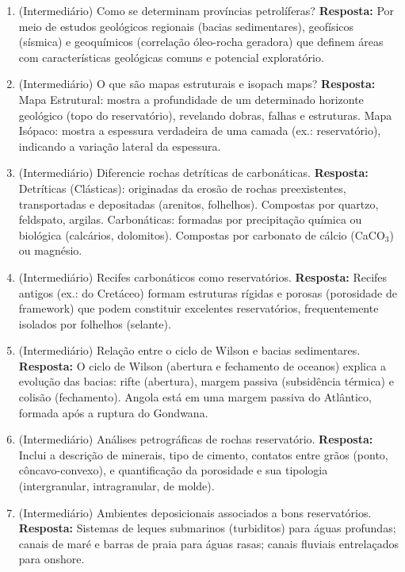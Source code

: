 \documentclass[11pt,a4paper]{article}
\begin{document}
\begin{enumerate}
  \item (Intermediário) Como se determinam províncias petrolíferas?
  \textbf{Resposta:} Por meio de estudos geológicos regionais (bacias sedimentares), geofísicos (sísmica) e geoquímicos (correlação óleo-rocha geradora) que definem áreas com características geológicas comuns e potencial exploratório.

  \item (Intermediário) O que são mapas estruturais e isopach maps?
  \textbf{Resposta:} Mapa Estrutural: mostra a profundidade de um determinado horizonte geológico (topo do reservatório), revelando dobras, falhas e estruturas. Mapa Isópaco: mostra a espessura verdadeira de uma camada (ex.: reservatório), indicando a variação lateral da espessura.

  \item (Intermediário) Diferencie rochas detríticas de carbonáticas.
  \textbf{Resposta:} Detríticas (Clásticas): originadas da erosão de rochas preexistentes, transportadas e depositadas (arenitos, folhelhos). Compostas por quartzo, feldspato, argilas. Carbonáticas: formadas por precipitação química ou biológica (calcários, dolomitos). Compostas por carbonato de cálcio (CaCO$_3$) ou magnésio.

  \item (Intermediário) Recifes carbonáticos como reservatórios.
  \textbf{Resposta:} Recifes antigos (ex.: do Cretáceo) formam estruturas rígidas e porosas (porosidade de framework) que podem constituir excelentes reservatórios, frequentemente isolados por folhelhos (selante).

  \item (Intermediário) Relação entre o ciclo de Wilson e bacias sedimentares.
  \textbf{Resposta:} O ciclo de Wilson (abertura e fechamento de oceanos) explica a evolução das bacias: rifte (abertura), margem passiva (subsidência térmica) e colisão (fechamento). Angola está em uma margem passiva do Atlântico, formada após a ruptura do Gondwana.

  \item (Intermediário) Análises petrográficas de rochas reservatório.
  \textbf{Resposta:} Inclui a descrição de minerais, tipo de cimento, contatos entre grãos (ponto, côncavo-convexo), e quantificação da porosidade e sua tipologia (intergranular, intragranular, de molde).

  \item (Intermediário) Ambientes deposicionais associados a bons reservatórios.
  \textbf{Resposta:} Sistemas de leques submarinos (turbiditos) para águas profundas; canais de maré e barras de praia para águas rasas; canais fluviais entrelaçados para onshore.


\end{enumerate}
\end{document}
